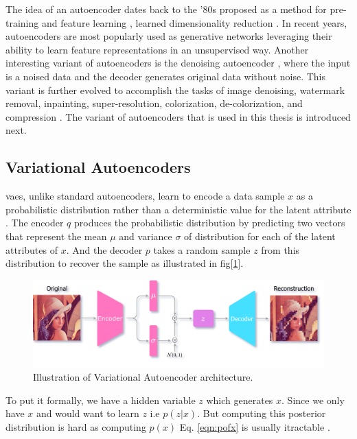 The idea of an autoencoder dates back to the '80s proposed as a method for pre-training and feature learning \cite{ballard1987modular, rumelhart1985learning}, learned dimensionality reduction \cite{hinton_dimentionality}. In recent years, autoencoders are most popularly used as generative networks leveraging their ability to learn feature representations in an unsupervised way. Another interesting variant of autoencoders is the denoising autoencoder \cite{vincent2008extracting}, where the input is a noised data and the decoder generates original data without noise. This variant is further evolved to accomplish the tasks of image denoising, watermark removal, inpainting, super-resolution, colorization, de-colorization, and compression \cite{zhang2016colorful, imagedenoisingpaper}. The variant of autoencoders that is used in this thesis is introduced next.

\subsection{Variational Autoencoders}
\acp{vae}, unlike standard autoencoders, learn to encode a data sample $x$ as a probabilistic distribution rather than a deterministic value for the latent attribute \cite{jeremy_jordan_2018}. The encoder $q$ produces the probabilistic distribution by predicting two vectors that represent the mean $\mu$ and variance $\sigma$ of distribution for each of the latent attributes of $x$. And the decoder $p$ takes a random sample $z$ from this distribution to recover the sample as illustrated in fig[\ref{fig:vae_arch}].

\begin{figure}[!h]
    \centering
    \includegraphics[scale=0.2]{figures/vae_arch.png}
    \caption{Illustration of Variational Autoencoder architecture.}
    \label{fig:vae_arch}
\end{figure}

To put it formally, we have a hidden variable $z$ which generates $x$. Since we only have $x$ and would want to learn $z$ i.e $p(z | x)$. But computing this posterior distribution is hard as computing $p(x)$ Eq. \ref{eqn:pofx} is usually itractable \cite{kingma2013autoencoding}.

